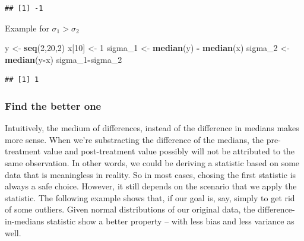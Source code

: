 \documentclass[]{article}
\newenvironment{Shaded}{\begin{snugshade}}{\end{snugshade}}
\newcommand{\KeywordTok}[1]{\textcolor[rgb]{0.13,0.29,0.53}{\textbf{#1}}}
\newcommand{\DecValTok}[1]{\textcolor[rgb]{0.00,0.00,0.81}{#1}}
\newcommand{\StringTok}[1]{\textcolor[rgb]{0.31,0.60,0.02}{#1}}
\newcommand{\OperatorTok}[1]{\textcolor[rgb]{0.81,0.36,0.00}{\textbf{#1}}}
\newcommand{\NormalTok}[1]{#1}
\begin{document}
\begin{verbatim}
## [1] -1
\end{verbatim}

Example for \(\sigma_1 > \sigma_2\)

\begin{Shaded}
\begin{Highlighting}[]
\NormalTok{y <-}\StringTok{ }\KeywordTok{seq}\NormalTok{(}\DecValTok{2}\NormalTok{,}\DecValTok{20}\NormalTok{,}\DecValTok{2}\NormalTok{)}
\NormalTok{x[}\DecValTok{10}\NormalTok{] <-}\StringTok{ }\DecValTok{1}
\NormalTok{sigma_}\DecValTok{1}\NormalTok{ <-}\StringTok{ }\KeywordTok{median}\NormalTok{(y) }\OperatorTok{-}\StringTok{ }\KeywordTok{median}\NormalTok{(x)}
\NormalTok{sigma_}\DecValTok{2}\NormalTok{ <-}\StringTok{ }\KeywordTok{median}\NormalTok{(y}\OperatorTok{-}\NormalTok{x)}
\NormalTok{sigma_}\DecValTok{1}\OperatorTok{-}\NormalTok{sigma_}\DecValTok{2}
\end{Highlighting}
\end{Shaded}

\begin{verbatim}
## [1] 1
\end{verbatim}

\subsubsection*{Find the better one}

Intuitively, the medium of differences, instead of the difference in
medians makes more sense. When we're substracting the difference of the
medians, the pre-treatment value and post-treatment value possibly will
not be attributed to the same observation. In other words, we could be
deriving a statistic based on some data that is meaningless in reality.
So in most cases, chosing the first statistic is always a safe choice.
However, it still depends on the scenario that we apply the statistic.
The following example shows that, if our goal is, say, simply to get rid
of some outliers. Given normal distributions of our original data, the
difference-in-medians statistic show a better property -- with less bias
and less variance as well.
\end{document}
